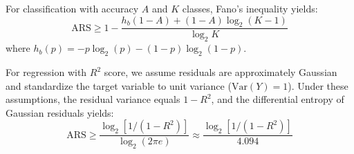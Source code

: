 For classification with accuracy $A$ and $K$ classes, Fano's inequality yields:
\begin{equation}
\text{ARS} \geq 1 - \frac{h_b(1-A) + (1-A)\log_2(K-1)}{\log_2 K}
\end{equation}
where $h_b(p) = -p\log_2(p) - (1-p)\log_2(1-p)$.

For regression with $R^2$ score, we assume residuals are approximately Gaussian and standardize the target variable to unit variance ($\text{Var}(Y)=1$). Under these assumptions, the residual variance equals $1-R^2$, and the differential entropy of Gaussian residuals yields:
\begin{equation}
\text{ARS} \geq \frac{\log_2[1/(1-R^2)]}{\log_2(2\pi e)} \approx \frac{\log_2[1/(1-R^2)]}{4.094}
\end{equation}
